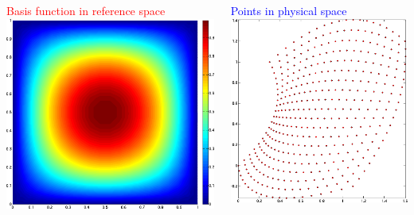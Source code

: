 \documentclass[8pt,xcolor=svgnames]{beamer}
\begin{document}
\begin{frame}
\begin{columns}
\begin{column}{0.6\textwidth}
\begin{columns}[t]
\begin{column}{0.5\textwidth}
\begin{center}
    \medskip
    \tiny{\textcolor{red}{Basis function in reference space}}
    \includegraphics[height=0.4\textheight,keepaspectratio=true]{./Images/Q2Basis_Reference.png}
   \end{center}
   \end{column}
   \begin{column}{0.5\textwidth}
   \begin{center}
    \tiny{\textcolor{blue}{Points in physical space}}
    \includegraphics[height=0.4\textheight,keepaspectratio=true]{./Images/Q2Points_Physical.png}
    

\end{center}
\end{column}
\end{columns}
\end{column}
\end{columns}
\end{frame}
\end{document}
